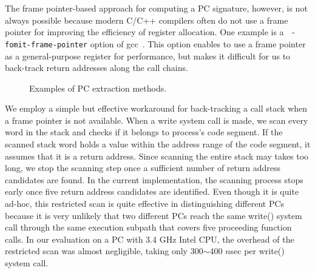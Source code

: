 The frame pointer-based approach for computing a PC signature, however, is not
always possible because modern C/C++ compilers often do not use a frame pointer
for improving the efficiency of register allocation.  One example is a {\tt
-fomit-frame-pointer} option of gcc~\cite{GCC}.  This option enables to use a frame
pointer as a general-purpose register for performance, but makes it difficult for us
to back-track return addresses along the call chains.  

\begin{figure}[t]
	\centering
	\hspace{2pt}
	\caption{Examples of PC extraction methods.}
	\label{fig:getpc}
\end{figure}

We employ a simple but effective workaround for back-tracking a call stack when
a frame pointer is not available.  When a write system call is made,
we scan every word in the stack
and checks if it belongs to process's code segment.  If the scanned stack word
holds a value within the address range of the code segment, it assumes that it
is a return address.  Since scanning the entire stack may takes too long, we stop
the scanning step once a sufficient number of return address candidates are found.
In the current implementation, the scanning process stops early once 
five return address candidates are identified.  
Even though it is quite ad-hoc, this restricted scan is quite effective
in distinguishing different PCs because it is very unlikely that two different PCs
reach the same write() system call through the same execution subpath 
that covers five proceeding function calls. 
In our evaluation on a PC with 3.4 GHz Intel CPU, the overhead of the
restricted scan was almost negligible, taking only 300$\sim$400 $n$sec per
\textsf{\small write()} system call.

